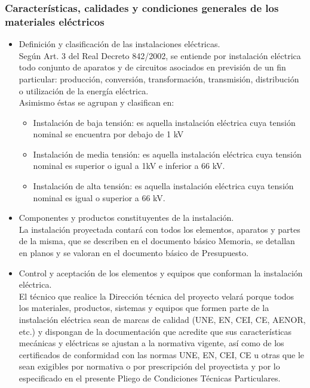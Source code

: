 \documentclass[../main.tex]{subfiles}
\begin{document}
\subsubsection{Características, calidades y condiciones generales de los materiales eléctricos}
\begin{itemize}
    \item Definición y clasificación de las instalaciones eléctricas. \\
    Según Art. 3 del Real Decreto 842/2002, se entiende  por instalación eléctrica todo conjunto de aparatos y de circuitos asociados en previsión de un fin particular: producción, conversión, transformación, transmisión, distribución o utilización de la energía eléctrica. \\
    Asimismo éstas se agrupan y clasifican en:
    \begin{itemize}
        \item Instalación de baja tensión: es aquella instalación eléctrica cuya tensión nominal se encuentra por debajo de 1 kV
        \item Instalación de media tensión: es aquella instalación eléctrica cuya tensión nominal es superior o igual a 1kV e inferior a 66 kV.
        \item Instalación de alta tensión: es aquella instalación eléctrica cuya tensión nominal es igual o superior a 66 kV.
    \end{itemize}
    \item Componentes y productos constituyentes de la instalación. \\
    La instalación proyectada contará con todos los elementos, aparatos y partes de la misma, que se describen en el documento básico Memoria, se detallan en planos y se valoran en el documento básico de Presupuesto.
    \item Control y aceptación de los elementos y equipos que conforman la instalación eléctrica. \\
    El técnico que realice la Dirección técnica del proyecto velará porque todos los materiales, productos, sistemas y equipos que formen parte de la instalación eléctrica sean de marcas de calidad (UNE, EN, CEI, CE, AENOR, etc.) y dispongan de la documentación que acredite que sus características mecánicas y eléctricas se ajustan a la normativa vigente, así como de los certificados de conformidad con las normas UNE, EN, CEI, CE u otras que le sean exigibles por normativa o por prescripción del proyectista y por lo especificado en el presente Pliego de Condiciones Técnicas Particulares. \par

\end{itemize}
\end{document}
